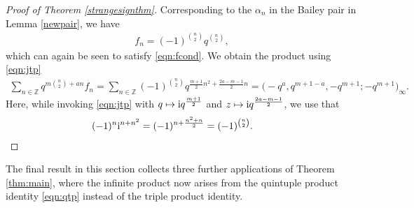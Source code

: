\documentclass[pdftex]{sigma}
\numberwithin{equation}{section}
\newcommand{\ZZ}{\mathbb{Z}}
\begin{document}
\begin{proof}[Proof of Theorem \ref{strangesignthm}]
	Corresponding to the $\alpha_n$ in the Bailey pair in Lemma \ref{newpair}, we have
	\begin{align} \label{eqn:fn3}
		f_n = (-1)^{\binom{n}{2}}q^{\binom{n}{2}},
	\end{align}	
	which can again be seen to satisfy \eqref{eqn:fcond}.
	We obtain the product using \eqref{eqn:jtp}
	\begin{align*}
		\sum_{n\in\ZZ}q^{m\binom{n}{2}+an}f_n =
		\sum_{n\in\ZZ}(-1)^{\binom{n}{2}}q^{\frac{m+1}{2}n^2+\frac{2a-m-1}{2}n}
		=\bigl(-q^{a} , q^{m+1-a} , -q^{m+1};-q^{m+1}\bigr)_\infty.
	\end{align*}
	Here, while invoking \eqref{eqn:jtp} with
	$q\mapsto {\rm i}q^{\frac{m+1}{2}}$ and $z\mapsto {\rm i}q^{\frac{2a-m-1}{2}}$,
	we use that
	\begin{align*}
		(-1)^{n}{\rm i}^{n+n^2}=(-1)^{n+\frac{n^2+n}{2}}
	=(-1)^{\binom{n}{2}}.
\tag*{\qed}
\end{align*}
\renewcommand{\qed}{}
\end{proof}

The final result in this section collects three further applications of Theorem \ref{thm:main}, where the infinite product now arises from the quintuple product identity \eqref{eqn:qtp} instead of the triple product identity.
\end{document}
